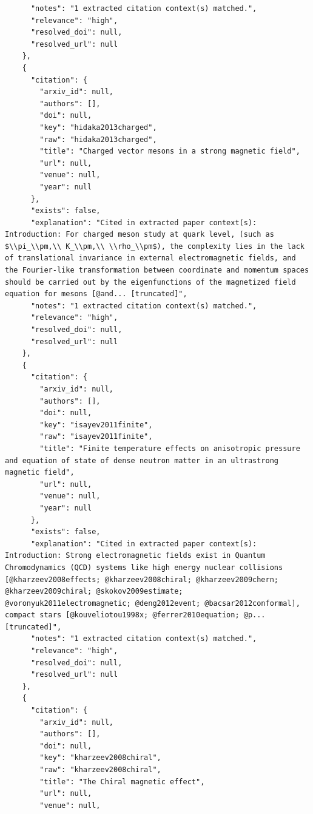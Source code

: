\documentclass[11pt]{article}
\begin{document}
\begin{verbatim}
      "notes": "1 extracted citation context(s) matched.",
      "relevance": "high",
      "resolved_doi": null,
      "resolved_url": null
    },
    {
      "citation": {
        "arxiv_id": null,
        "authors": [],
        "doi": null,
        "key": "hidaka2013charged",
        "raw": "hidaka2013charged",
        "title": "Charged vector mesons in a strong magnetic field",
        "url": null,
        "venue": null,
        "year": null
      },
      "exists": false,
      "explanation": "Cited in extracted paper context(s): Introduction: For charged meson study at quark level, (such as $\\pi_\\pm,\\ K_\\pm,\\ \\rho_\\pm$), the complexity lies in the lack of translational invariance in external electromagnetic fields, and the Fourier-like transformation between coordinate and momentum spaces should be carried out by the eigenfunctions of the magnetized field equation for mesons [@and... [truncated]",
      "notes": "1 extracted citation context(s) matched.",
      "relevance": "high",
      "resolved_doi": null,
      "resolved_url": null
    },
    {
      "citation": {
        "arxiv_id": null,
        "authors": [],
        "doi": null,
        "key": "isayev2011finite",
        "raw": "isayev2011finite",
        "title": "Finite temperature effects on anisotropic pressure and equation of state of dense neutron matter in an ultrastrong magnetic field",
        "url": null,
        "venue": null,
        "year": null
      },
      "exists": false,
      "explanation": "Cited in extracted paper context(s): Introduction: Strong electromagnetic fields exist in Quantum Chromodynamics (QCD) systems like high energy nuclear collisions [@kharzeev2008effects; @kharzeev2008chiral; @kharzeev2009chern; @kharzeev2009chiral; @skokov2009estimate; @voronyuk2011electromagnetic; @deng2012event; @bacsar2012conformal], compact stars [@kouveliotou1998x; @ferrer2010equation; @p... [truncated]",
      "notes": "1 extracted citation context(s) matched.",
      "relevance": "high",
      "resolved_doi": null,
      "resolved_url": null
    },
    {
      "citation": {
        "arxiv_id": null,
        "authors": [],
        "doi": null,
        "key": "kharzeev2008chiral",
        "raw": "kharzeev2008chiral",
        "title": "The Chiral magnetic effect",
        "url": null,
        "venue": null,

\end{verbatim}
\end{document}
